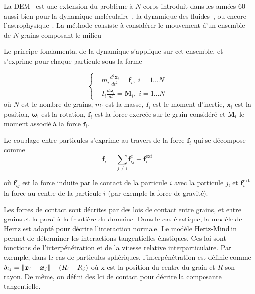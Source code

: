 La DEM~\cite{cundall_discrete_1979} est une extension du problème à $N$-corps introduit dans les années 60 aussi bien pour la dynamique moléculaire~\cite{Alder1959}, la dynamique des fluides~\cite{Allen1987}, ou encore l'astrophysique~\cite{vonHoerner1960}.
La méthode consiste à considérer le mouvement d'un ensemble de $N$ grains composant le milieu.

Le principe fondamental de la dynamique s'applique sur cet ensemble, et s'exprime pour chaque particule sous la forme

\begin{equation*}
    \left\{
    \begin{aligned}
         & m_{i} \frac{ d^{2}\bm{x}_i }{dt^2}=\bm{f}_{i},\; i=1\ldots N \\
         & I_{i} \frac{d \bm{\omega}_{i}}{dt}=\bm{M}_{i},\; i=1\ldots N
    \end{aligned}
    \right.
\end{equation*}où $N$ est le nombre de grains, $m_{i}$ est la masse, $I_i$ est le moment d'inertie, $\bm{x}_{i}$ est la position, $\bm{\omega_{i}}$ est la rotation, $\bm{f}_{i}$ est la force exercée sur le grain considéré et $\bm{M_{i}}$ le moment associé à la force $\bm{f}_{i}$.

Le couplage entre particules s'exprime au travers de la force $\bm{f}_{i}$ qui se décompose comme
\begin{equation*}
    \bm{f}_{i}=\underset{{\scriptstyle j\neq i}}{\sum}\bm{f}^{c}_{ij}+\bm{f}_i^{\text{ext}}
\end{equation*}

où $\bm{f}^{c}_{ij}$ est la force induite par le contact de la particule $i$ avec la particule $j$, et $\bm{f}_ i^{\text{ext}}$ la force au centre de la particule $i$ (par exemple la force de gravité).

Les forces de contact sont décrites par des lois de contact entre grains, et entre grains et la paroi à la frontière du domaine. Dans le cas élastique, la modèle de Hertz est adapté pour décrire l’interaction normale. Le modèle Hertz-Mindlin permet de déterminer les interactions tangentielles élastiques. Ces loi sont fonctions de l'interpénétration et de la vitesse relative interparticulaire. Par exemple, dans le cas de particules sphériques, l'interpénétration est définie comme $\delta_{ij} = \left\lVert \bm x_i - \bm x_j \right\rVert - (R_i - R_j)$ où $\bm x$  est la position du centre du grain et $R$ son rayon. De même, on défini des loi de contact pour décrire la composante tangentielle.

